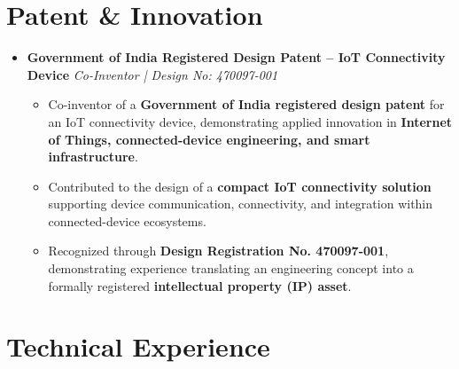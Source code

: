 \documentclass[a4paper,11pt]{article}
\newcommand{\resumeItem}[1]{
    \item \small{#1 \vspace{-2pt}}
}
\begin{document}
\vspace{-10pt}


\section{Patent \& Innovation}

\begin{itemize}[leftmargin=0in, label={}]

\item
\textbf{Government of India Registered Design Patent -- IoT Connectivity Device}
\hfill \textit{Co-Inventor | Design No: 470097-001}

\begin{itemize}[leftmargin=*]

\resumeItem{Co-inventor of a \textbf{Government of India registered design patent} for an IoT connectivity device, demonstrating applied innovation in \textbf{Internet of Things, connected-device engineering, and smart infrastructure}.}

\resumeItem{Contributed to the design of a \textbf{compact IoT connectivity solution} supporting device communication, connectivity, and integration within connected-device ecosystems.}

\resumeItem{Recognized through \textbf{Design Registration No. 470097-001}, demonstrating experience translating an engineering concept into a formally registered \textbf{intellectual property (IP) asset}.}

\end{itemize}

\end{itemize}

\vspace{-10pt}



\section{Technical Experience}
\end{document}
